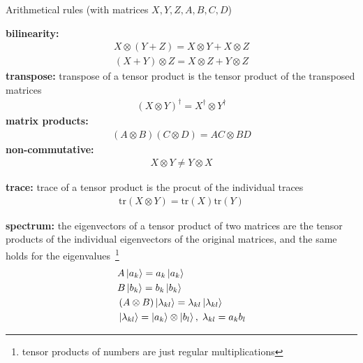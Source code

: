 Arithmetical rules (with matrices $X,Y,Z,A,B,C,D$)

\begin{theorem*}
\textbf{bilinearity: }
\begin{align}
     X \otimes (Y + Z) = X\otimes Y + X\otimes Z
\end{align}
\begin{align}
     (X+Y) \otimes Z = X\otimes Z + Y\otimes Z
\end{align}
\textbf{transpose: } transpose of a tensor product is the tensor product of the transposed matrices
\begin{align}
    \left( X \otimes Y \right)^\dagger = X^\dagger \otimes Y^\dagger 
\end{align}
\textbf{matrix products:}
\begin{align}
    \left(A\otimes B\right) \left( C \otimes D \right) = AC \otimes BD
\end{align}
\textbf{non-commutative:}
\begin{align}
    X \otimes Y \neq Y \otimes X
\end{align}

\textbf{trace: } trace of a tensor product is the procut of the individual traces
\begin{align}
    \text{tr}\left(X\otimes Y\right) = \text{tr}\left(X\right)\text{tr}\left(Y\right)
\end{align}

\textbf{spectrum: } the eigenvectors of a tensor product of two matrices are the tensor products of the individual eigenvectors of the original matrices, and the same holds for the eigenvalues~\footnote{tensor products of numbers are just regular multiplications}
\begin{align}
    &A \ket{a_k} = a_k \ket{a_k} \\
    &B \ket{b_k} = b_k \ket{b_k} \\
    &\left(A \otimes B\right)\ket{\lambda_{kl}} = \lambda_{kl} \ket{\lambda_{kl}}\\
    &\ket{\lambda_{kl}} = \ket{a_{k}}\otimes\ket{b_l}, \; \lambda_{kl} = a_{k}b_{l}
\end{align}
\end{theorem*}






